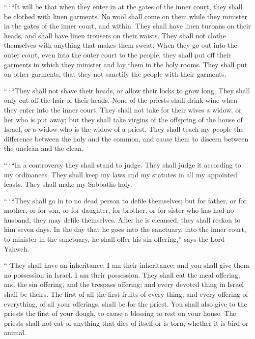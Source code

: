  ``\,`\,``It will be that when they enter in at the gates
of the inner court, they shall be clothed with linen garments. No wool
shall come on them while they minister in the gates of the inner court,
and within.  They shall have linen turbans on their
heads, and shall have linen trousers on their waists. They shall not
clothe themselves with anything that makes them sweat. 
When they go out into the outer court, even into the outer court to the
people, they shall put off their garments in which they minister and lay
them in the holy rooms. They shall put on other garments, that they not
sanctify the people with their garments.

 ``\,`\,``They shall not shave their heads, or allow
their locks to grow long. They shall only cut off the hair of their
heads.  None of the priests shall drink wine when they
enter into the inner court.  They shall not take for
their wives a widow, or her who is put away; but they shall take virgins
of the offspring of the house of Israel, or a widow who is the widow of
a priest.  They shall teach my people the difference
between the holy and the common, and cause them to discern between the
unclean and the clean.

 ``\,`\,``In a controversy they shall stand to judge.
They shall judge it according to my ordinances. They shall keep my laws
and my statutes in all my appointed feasts. They shall make my Sabbaths
holy.

 ``\,`\,``They shall go in to no dead person to defile
themselves; but for father, or for mother, or for son, or for daughter,
for brother, or for sister who has had no husband, they may defile
themselves.  After he is cleansed, they shall reckon to
him seven days.  In the day that he goes into the
sanctuary, into the inner court, to minister in the sanctuary, he shall
offer his sin offering,'' says the Lord Yahweh.

 ``\,`They shall have an inheritance: I am their
inheritance; and you shall give them no possession in Israel. I am their
possession.  They shall eat the meal offering, and the
sin offering, and the trespass offering; and every devoted thing in
Israel shall be theirs.  The first of all the first
fruits of every thing, and every offering of everything, of all your
offerings, shall be for the priest. You shall also give to the priests
the first of your dough, to cause a blessing to rest on your house.
 The priests shall not eat of anything that dies of
itself or is torn, whether it is bird or animal.

